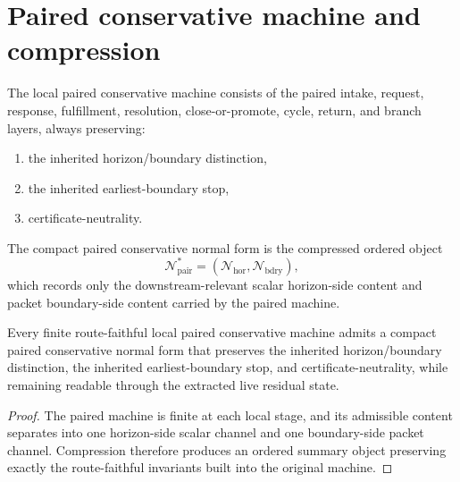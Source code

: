 \section{Paired conservative machine and compression}
\begin{definition}\label{def:paired-machine}
The local paired conservative machine consists of the paired intake, request, response, fulfillment, resolution, close-or-promote, cycle, return, and branch layers, always preserving:
\begin{enumerate}[leftmargin=2em]
 \item the inherited horizon/boundary distinction,
 \item the inherited earliest-boundary stop,
 \item certificate-neutrality.
\end{enumerate}
\end{definition}

\begin{definition}\label{def:compact-normal-form}
The compact paired conservative normal form is the compressed ordered object
\[
\mathcal{N}^{\ast}_{\mathrm{pair}}=(\mathcal{N}_{\mathrm{hor}},\mathcal{N}_{\mathrm{bdry}}),
\]
which records only the downstream-relevant scalar horizon-side content and packet boundary-side content carried by the paired machine.
\end{definition}

\begin{theorem}\label{thm:compression-invariant-control}
Every finite route-faithful local paired conservative machine admits a compact paired conservative normal form that preserves the inherited horizon/boundary distinction, the inherited earliest-boundary stop, and certificate-neutrality, while remaining readable through the extracted live residual state.
\end{theorem}

\begin{proof}
The paired machine is finite at each local stage, and its admissible content separates into one horizon-side scalar channel and one boundary-side packet channel. Compression therefore produces an ordered summary object preserving exactly the route-faithful invariants built into the original machine.
\end{proof}

